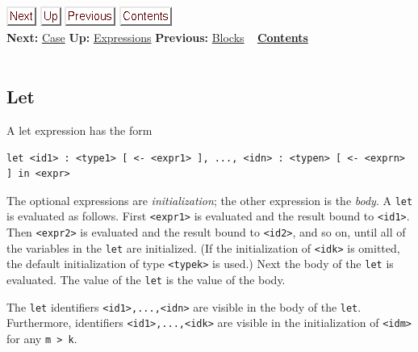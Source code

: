 \documentclass[]{article}
\begin{document}
\href{node22.html}{\includegraphics{next.png}}
\href{node13.html}{\includegraphics{up.png}}
\href{node20.html}{\includegraphics{prev.png}}
\href{node1.html}{\includegraphics{contents.png}} \\ \textbf{Next:}
\href{node22.html}{Case} \textbf{Up:} \href{node13.html}{Expressions}
\textbf{Previous:} \href{node20.html}{Blocks} ~
\textbf{\href{node1.html}{Contents}} \\ \\

\subsection{Let}

A let expression has the form

\begin{verbatim}
let <id1> : <type1> [ <- <expr1> ], ..., <idn> : <typen> [ <- <exprn> ] in <expr>
\end{verbatim}

The optional expressions are \emph{initialization}; the other expression
is the \emph{body}. A \texttt{let} is evaluated as follows. First
\texttt{\textless{}expr1\textgreater{}} is evaluated and the result
bound to \texttt{\textless{}id1\textgreater{}}. Then
\texttt{\textless{}expr2\textgreater{}} is evaluated and the result
bound to \texttt{\textless{}id2\textgreater{}}, and so on, until all of
the variables in the \texttt{let} are initialized. (If the
initialization of \texttt{\textless{}idk\textgreater{}} is omitted, the
default initialization of type \texttt{\textless{}typek\textgreater{}}
is used.) Next the body of the \texttt{let} is evaluated. The value of
the \texttt{let} is the value of the body.

The \texttt{let} identifiers
\texttt{\textless{}id1\textgreater{},...,\textless{}idn\textgreater{}}
are visible in the body of the \texttt{let}. Furthermore, identifiers
\texttt{\textless{}id1\textgreater{},...,\textless{}idk\textgreater{}}
are visible in the initialization of
\texttt{\textless{}idm\textgreater{}} for any
\texttt{m \textgreater{} k}.
\end{document}

